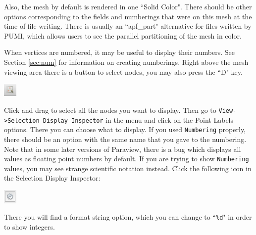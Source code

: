 \documentclass{article}
\begin{document}
Also, the mesh by default is rendered in one ``Solid Color".
There should be other options corresponding to the fields and numberings
that were on this mesh at the time of file writing.
There is usually an ``apf\_part" alternative for files written by PUMI, which
allows users to see the parallel partitioning of the mesh in color.

When vertices are numbered, it may be useful to display their numbers.
See Section \ref{sec:num} for information on creating numberings.
Right above the mesh viewing area there is a button to select nodes,
you may also press the ``D" key.

\begin{center}
\includegraphics[width=0.05\textwidth]{select_nodes.png}
\end{center}

Click and drag to select all the nodes you want to display.
Then go to \texttt{View->Selection Display Inspector} in the menu and click on
the Point Labels options.
There you can choose what to display.
If you used \texttt{Numbering} properly, there should be an option
with the same name that you gave to the numbering.
Note that in some later versions of Paraview, there is a bug which
displays all values as floating point numbers by default.
If you are trying to show \texttt{Numbering} values, you may
see strange scientific notation instead.
Click the following icon in the Selection Display Inspector:

\begin{center}
\includegraphics[width=0.05\textwidth]{gear.png}
\end{center}

There you will find a format string option, which you can change
to ``\texttt{\%d}" in order to show integers.
\end{document}
